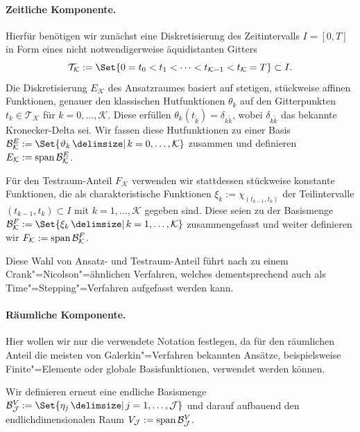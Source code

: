 \documentclass[../main.tex]{subfiles}
\begin{document}
\paragraph{Zeitliche Komponente.} %
\label{par:zeitliche_komponente}

Hierfür benötigen wir zunächst eine Diskretisierung des Zeitintervalls $I = [0, T]$ in Form eines nicht notwendigerweise äquidistanten Gitters
\begin{equation}\label{eq:zeitgitter}
    \mathcal T_{\mathcal K} := \Set{0 = t_0 < t_1 < \dots < t_{\mathcal K - 1} < t_{\mathcal K} = T} \subset I.
\end{equation}
Die Diskretisierung $E_{\mathcal K}$ des Ansatzraumes basiert auf stetigen, stückweise affinen Funktionen, genauer den klassischen Hutfunktionen $\theta_{k}$ auf den Gitterpunkten $t_{k} \in \mathcal T_{\mathcal K}$ für $k = 0, \dots, \mathcal K$.
Diese erfüllen $\theta_{k}(t_{\tilde{k}}) = \delta_{k \tilde k}$, wobei $\delta_{k \tilde k}$ das bekannte Kronecker-Delta sei.
Wir fassen diese Hutfunktionen zu einer Basis $\mathcal B^{E}_{\mathcal K} := \Set{ \theta_{k} \given k = 0, \dots, \mathcal K }$ zusammen und definieren $E_{\mathcal K} := \operatorname{span} \mathcal B^{E}_{\mathcal K}$.

Für den Testraum-Anteil $F_{\mathcal K}$ verwenden wir stattdessen stückweise konstante Funktionen, die als charakteristische Funktionen $\xi_{k} := \chi_{(t_{k-1}, t_{k})}$ der Teilintervalle $(t_{k - 1}, t_{k}) \subset I$ mit $k = 1, \dots, \mathcal K$ gegeben sind.
Diese seien zu der Basismenge $\mathcal B^{F}_{\mathcal K} := \Set{ \xi_{k} \given k = 1, \dots, \mathcal K}$ zusammengefasst und weiter definieren wir $F_{\mathcal K} := \operatorname{span} \mathcal B^{F}_{\mathcal K}$.

Diese Wahl von Ansatz- und Testraum-Anteil führt nach \cite{Andreev:2012ep} zu einem Crank"=Nicolson"=ähnlichen Verfahren, welches dementsprechend auch als Time"=Stepping"=Verfahren aufgefasst werden kann.


\paragraph{Räumliche Komponente.} %
\label{par:raeumliche_komponente}

Hier wollen wir nur die verwendete Notation festlegen, da für den räumlichen Anteil die meisten von Galerkin"=Verfahren bekannten Ansätze, beispielsweise Finite"=Elemente oder globale Basisfunktionen, verwendet werden können.

Wir definieren erneut eine endliche Basismenge $\mathcal B^{V}_{\mathcal J} := \Set{ \eta_{j} \given j = 1, \dots, \mathcal J}$ und darauf aufbauend den endlichdimensionalen Raum $V_{\mathcal J} := \operatorname{span} \mathcal B^{V}_{\mathcal J}$.
\end{document}
